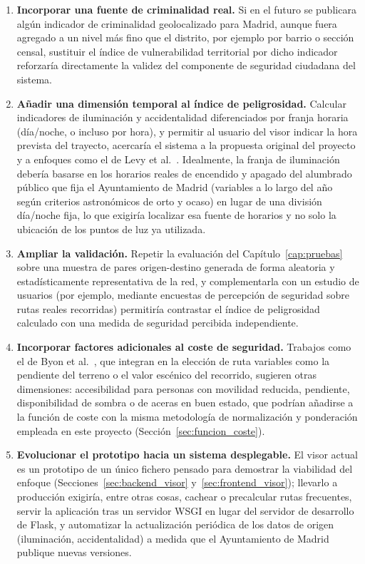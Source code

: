 \begin{enumerate}
    \item \textbf{Incorporar una fuente de criminalidad real.} Si en el futuro se publicara algún indicador de criminalidad geolocalizado para Madrid, aunque fuera agregado a un nivel más fino que el distrito, por ejemplo por barrio o sección censal, sustituir el índice de vulnerabilidad territorial por dicho indicador reforzaría directamente la validez del componente de seguridad ciudadana del sistema.

    \item \textbf{Añadir una dimensión temporal al índice de peligrosidad.} Calcular indicadores de iluminación y accidentalidad diferenciados por franja horaria (día/noche, o incluso por hora), y permitir al usuario del visor indicar la hora prevista del trayecto, acercaría el sistema a la propuesta original del proyecto y a enfoques como el de Levy et al.\ \cite{levy2020}. Idealmente, la franja de iluminación debería basarse en los horarios reales de encendido y apagado del alumbrado público que fija el Ayuntamiento de Madrid (variables a lo largo del año según criterios astronómicos de orto y ocaso) en lugar de una división día/noche fija, lo que exigiría localizar esa fuente de horarios y no solo la ubicación de los puntos de luz ya utilizada.

    \item \textbf{Ampliar la validación.} Repetir la evaluación del Capítulo~\ref{cap:pruebas} sobre una muestra de pares origen-destino generada de forma aleatoria y estadísticamente representativa de la red, y complementarla con un estudio de usuarios (por ejemplo, mediante encuestas de percepción de seguridad sobre rutas reales recorridas) permitiría contrastar el índice de peligrosidad calculado con una medida de seguridad percibida independiente.

    \item \textbf{Incorporar factores adicionales al coste de seguridad.} Trabajos como el de Byon et al.\ \cite{byon2010}, que integran en la elección de ruta variables como la pendiente del terreno o el valor escénico del recorrido, sugieren otras dimensiones: accesibilidad para personas con movilidad reducida, pendiente, disponibilidad de sombra o de aceras en buen estado, que podrían añadirse a la función de coste con la misma metodología de normalización y ponderación empleada en este proyecto (Sección~\ref{sec:funcion_coste}).

    \item \textbf{Evolucionar el prototipo hacia un sistema desplegable.} El visor actual es un prototipo de un único fichero pensado para demostrar la viabilidad del enfoque (Secciones~\ref{sec:backend_visor} y~\ref{sec:frontend_visor}); llevarlo a producción exigiría, entre otras cosas, cachear o precalcular rutas frecuentes, servir la aplicación tras un servidor WSGI en lugar del servidor de desarrollo de Flask, y automatizar la actualización periódica de los datos de origen (iluminación, accidentalidad) a medida que el Ayuntamiento de Madrid publique nuevas versiones.


\end{enumerate}
